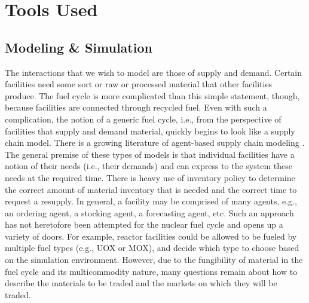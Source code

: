 
\section{Tools Used}

\subsection{Modeling \& Simulation}\label{intro:sim}

The interactions that we wish to model are those of supply and demand. Certain
facilities need some sort or raw or processed material that other facilities
produce. The fuel cycle is more complicated than this simple statement, though,
because facilities are connected through recycled fuel. Even with such a
complication, the notion of a generic fuel cycle, i.e., from the perspective of
facilities that supply and demand material, quickly begins to look like a supply
chain model. There is a growing literature of agent-based supply chain modeling
\cite{swaminathan_modeling_1998,julka_agent-based_2002,van_der_zee_modeling_2005,chatfield_multi-formalism_2007,holmgren_agent_2007}.
The general premise of these types of models is that individual facilities have
a notion of their needs (i.e., their demands) and can express to the system
these needs at the required time. There is heavy use of inventory policy to
determine the correct amount of material inventory that is needed and the
correct time to request a resupply. In general, a facility may be comprised of
many agents, e.g., an ordering agent, a stocking agent, a forecasting agent,
etc. Such an approach has not heretofore been attempted for the nuclear fuel
cycle and opens up a variety of doors. For example, reactor facilities could be
allowed to be fueled by multiple fuel types (e.g., UOX or MOX), and decide which
type to choose based on the simulation environment. However, due to the
fungibility of material in the fuel cycle and its multicommodity nature, many
questions remain about how to describe the materials to be traded and the
markets on which they will be traded. 

